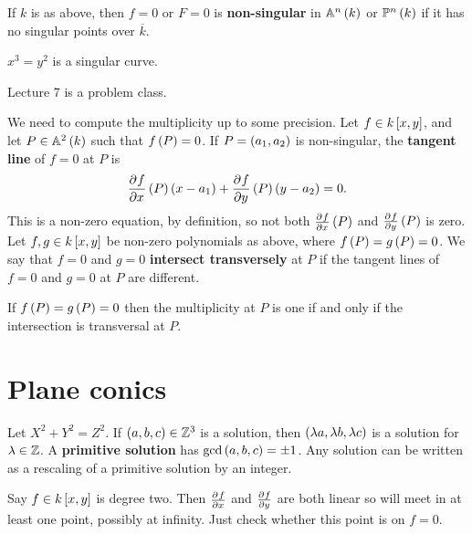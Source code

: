 \begin{definition}
If $ k $ is as above, then $ f = 0 $ or $ F = 0 $ is \textbf{non-singular} in $ \AA^n\br{k} $ or $ \PP^n\br{k} $ if it has no singular points over $ \overline{k} $.
\end{definition}

\begin{example*}
$ x^3 = y^2 $ is a singular curve.
\end{example*}


Lecture 7 is a problem class.


We need to compute the multiplicity up to some precision. Let $ f \in k\sbr{x, y} $, and let $ P \in \AA^2\br{k} $ such that $ f\br{P} = 0 $. If $ P = \br{a_1, a_2} $ is non-singular, the \textbf{tangent line} of $ f = 0 $ at $ P $ is
$$ \dpd{f}{x}\br{P}\br{x - a_1} + \dpd{f}{y}\br{P}\br{y - a_2} = 0. $$
This is a non-zero equation, by definition, so not both $ \tpd{f}{x}\br{P} $ and $ \tpd{f}{y}\br{P} $ is zero. Let $ f, g \in k\sbr{x, y} $ be non-zero polynomials as above, where $ f\br{P} = g\br{P} = 0 $. We say that $ f = 0 $ and $ g = 0 $ \textbf{intersect transversely} at $ P $ if the tangent lines of $ f = 0 $ and $ g = 0 $ at $ P $ are different.

\begin{theorem}
If $ f\br{P} = g\br{P} = 0 $ then the multiplicity at $ P $ is one if and only if the intersection is transversal at $ P $.
\end{theorem}

\pagebreak

\section{Plane conics}

Let $ X^2 + Y^2 = Z^2 $. If $ \br{a, b, c} \in \ZZ^3 $ is a solution, then $ \br{\lambda a, \lambda b, \lambda c} $ is a solution for $ \lambda \in \mathbb{Z} $. A \textbf{primitive solution} has $ \gcd\br{a, b, c} = \pm 1 $. Any solution can be written as a rescaling of a primitive solution by an integer.

\begin{algorithm}
Say $ f \in k\sbr{x, y} $ is degree two. Then $ \tpd{f}{x} $ and $ \tpd{f}{y} $ are both linear so will meet in at least one point, possibly at infinity. Just check whether this point is on $ f = 0 $.
\end{algorithm}

